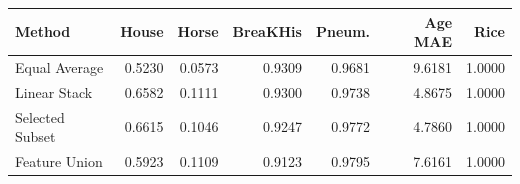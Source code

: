 \begin{tabular}{lrrrrrr}
\toprule
Method & House & Horse & BreaKHis & Pneum. & Age MAE & Rice\\
\midrule
Equal Average & 0.5230 & 0.0573 & 0.9309 & 0.9681 & 9.6181 & 1.0000\\
Linear Stack & 0.6582 & 0.1111 & 0.9300 & 0.9738 & 4.8675 & 1.0000\\
Selected Subset & 0.6615 & 0.1046 & 0.9247 & 0.9772 & 4.7860 & 1.0000\\
Feature Union & 0.5923 & 0.1109 & 0.9123 & 0.9795 & 7.6161 & 1.0000\\
\bottomrule
\end{tabular}
